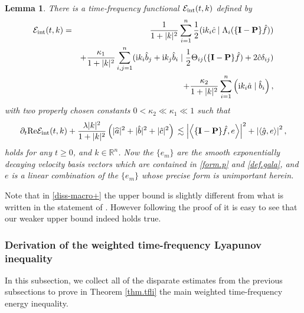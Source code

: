 \documentclass{amsart}
\newtheorem{lemma}{Lemma}[section]
\numberwithin{equation}{section}
\begin{document}
\begin{lemma}
There is a time-frequency functional ${\mathcal{E}}_{\rm int}(t,k)$ defined by 
\begin{eqnarray}
  \label{def.int1}
  {\mathcal{E}}_{\rm int}(t,k) &=& \frac{1}{1+|k|^2}\sum_{i=1}^{n}\frac{1}{2} ({{\rm i}} k_i \hat{c}\mid {\Lambda}_i(\{{\mathbf{I}}-{\mathbf{P}}\}\hat{f}))\\
  \notag
  &&+\frac{{\kappa}_1}{1+|k|^2}\sum_{i,j=1}^{n}({{\rm i}} k_i \hat{b}_j+{{\rm i}} k_j\hat{b}_i\mid \frac{1}{2} {\Theta}_{ij}(\{{\mathbf{I}}-{\mathbf{P}}\}\hat{f})+2\hat{c}{\delta}_{ij})\\
  && +\frac{{\kappa}_2}{1+|k|^2}\sum_{i=1}^{n}\left({{\rm i}} k_i \hat{a}\mid \hat{b}_i\right),
\notag
\end{eqnarray}
with two properly chosen constants $0<\kappa_2\ll\kappa_1\ll 1$ such that
\begin{equation}
{\displaystyle} {\partial}_t {{\rm Re}} {\mathcal{E}}_{\rm int}(t,k)+\frac{{\lambda} |k|^2}{1+|k|^2} \left(|\widehat{a}|^2+|\hat{b}|^2+|\hat{c}|^2\right)
{\displaystyle} 
\lesssim
\left| { \left< {{\{{\mathbf{I}}-{\mathbf{P}}\}\hat{f}, {e}}} \right> } \right|^2
+
\left| { \left< {{\hat{g}, {e}}} \right> } \right|^2,
\label{diss-macro+}
\end{equation}
holds for any $t\geq 0$, and $k\in {{\mathbb R}^{n}}$.  Now the $\{ {e}_{m} \}$ are the smooth exponentially decaying velocity basis vectors which are contained in \eqref{form.p} and \eqref{def.gala}, and ${e}$ is a linear combination of the $\{ {e}_{m} \}$ whose precise form is unimportant herein.  
\end{lemma}

Note that in \eqref{diss-macro+} the upper bound is slightly different from what is written in the statement of \cite[Lemma 4.1]{D-Hypo}. However following the proof of \cite[Lemma 4.1]{D-Hypo} it is easy to see that our weaker upper bound indeed holds true.

\subsubsection{Derivation of the weighted time-frequency Lyapunov inequality}
In this subsection, we collect all of the disparate estimates from the previous subsections to prove in Theorem \ref{thm.tfli}
the main weighted time-frequency energy inequality.
\end{document}
